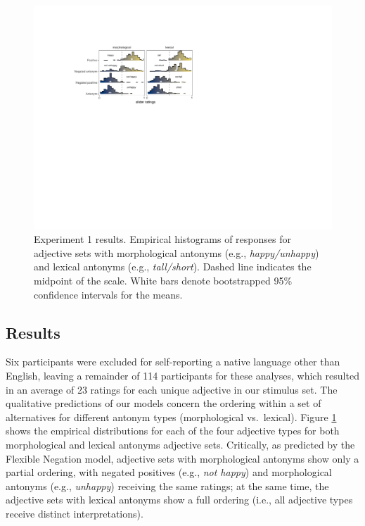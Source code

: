 \documentclass[floatsintext,doc]{apa6}
\newcommand{\ourmodel}{Flexible Negation\xspace}
\begin{document}
\begin{figure}[h]
\centering \includegraphics[width=0.95\linewidth]{figs/expt1_directlabel_hist} 
\caption{ Experiment 1 results. Empirical histograms of responses for adjective sets with morphological antonyms (e.g., \emph{happy/unhappy}) and lexical antonyms (e.g., \emph{tall/short}). Dashed line indicates the midpoint of the scale.  White bars denote bootstrapped 95\% confidence intervals for the means.}\label{fig:expt1-results}
\end{figure}
\subsection{Results}\label{results}%

Six participants were excluded for self-reporting a native language other than English, leaving a remainder of 114 participants for these analyses, which resulted in an average of 23 ratings for each unique adjective in our stimulus set.
The qualitative predictions of our models concern the ordering within a set of alternatives for different antonym types (morphological vs.~lexical).
Figure \ref{fig:expt1-results} shows the empirical distributions for each of the four adjective types for both morphological and lexical antonyms adjective sets.
Critically, as predicted by the \ourmodel model, adjective sets with morphological antonyms show only a partial ordering, with negated positives (e.g., \emph{not happy}) and morphological antonyms (e.g., \emph{unhappy}) receiving the same ratings; at the same time, the adjective sets with lexical antonyms show a full ordering (i.e., all adjective types receive distinct interpretations).
\end{document}

